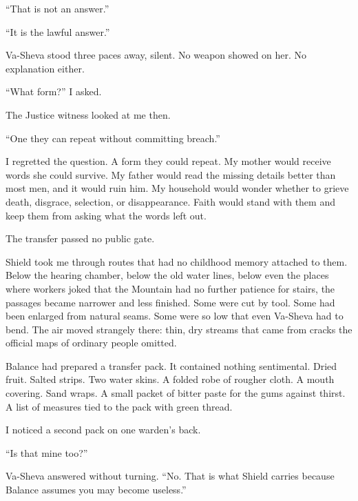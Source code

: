 ``That is not an answer.''\par

``It is the lawful answer.''\par

Va-Sheva stood three paces away, silent. No weapon showed on her. No explanation either.\par

``What form?'' I asked.\par

The Justice witness looked at me then.\par

``One they can repeat without committing breach.''\par

I regretted the question. A form they could repeat. My mother would receive words she could survive. My father would read the missing details better than most men, and it would ruin him. My household would wonder whether to grieve death, disgrace, selection, or disappearance. Faith would stand with them and keep them from asking what the words left out.\par

The transfer passed no public gate.\par

Shield took me through routes that had no childhood memory attached to them. Below the hearing chamber, below the old water lines, below even the places where workers joked that the Mountain had no further patience for stairs, the passages became narrower and less finished. Some were cut by tool. Some had been enlarged from natural seams. Some were so low that even Va-Sheva had to bend. The air moved strangely there: thin, dry streams that came from cracks the official maps of ordinary people omitted.\par

Balance had prepared a transfer pack. It contained nothing sentimental. Dried fruit. Salted strips. Two water skins. A folded robe of rougher cloth. A mouth covering. Sand wraps. A small packet of bitter paste for the gums against thirst. A list of measures tied to the pack with green thread.\par

I noticed a second pack on one warden's back.\par

``Is that mine too?''\par

Va-Sheva answered without turning. ``No. That is what Shield carries because Balance assumes you may become useless.''\par


